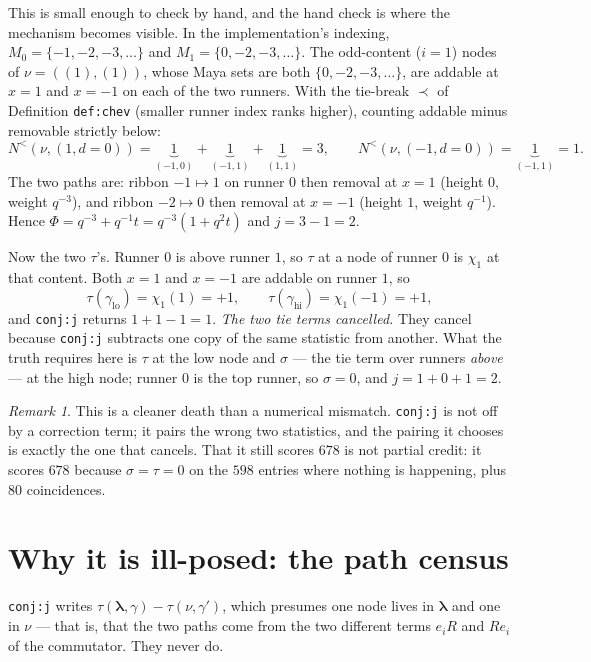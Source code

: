 \documentclass[11pt]{article}
\theoremstyle{definition}
\theoremstyle{remark}
\newtheorem{remark}[theorem]{Remark}
\newcommand{\bl}{\boldsymbol{\lambda}}
\newcommand{\Nlt}{N^{<}}
\begin{document}
This is small enough to check by hand, and the hand check is where the mechanism becomes
visible. In the implementation's indexing, $M_0=\{-1,-2,-3,\dots\}$ and
$M_1=\{0,-2,-3,\dots\}$. The odd-content ($i=1$) nodes of $\nu=((1),(1))$, whose Maya
sets are both $\{0,-2,-3,\dots\}$, are addable at $x=1$ and $x=-1$ on each of the two
runners. With the tie-break $\prec$ of Definition \texttt{def:chev} (smaller runner index
ranks higher), counting addable minus removable strictly below:
\[
\Nlt(\nu,(1,d{=}0))=\underbrace{1}_{(-1,0)}+\underbrace{1}_{(-1,1)}+\underbrace{1}_{(1,1)}=3,
\qquad
\Nlt(\nu,(-1,d{=}0))=\underbrace{1}_{(-1,1)}=1 .
\]
The two paths are: ribbon $-1\mapsto1$ on runner $0$ then removal at $x=1$ (height $0$,
weight $q^{-3}$), and ribbon $-2\mapsto0$ then removal at $x=-1$ (height $1$, weight
$q^{-1}$). Hence $\Phi=q^{-3}+q^{-1}t=q^{-3}(1+q^{2}t)$ and $j=3-1=2$.

Now the two $\tau$'s. Runner $0$ is above runner $1$, so $\tau$ at a node of runner $0$
is $\chi_1$ at that content. Both $x=1$ and $x=-1$ are addable on runner $1$, so
\[
\tau(\gamma_{\mathrm{lo}})=\chi_1(1)=+1,\qquad \tau(\gamma_{\mathrm{hi}})=\chi_1(-1)=+1,
\]
and \texttt{conj:j} returns $1+1-1=1$. \emph{The two tie terms cancelled.} They cancel
because \texttt{conj:j} subtracts one copy of the same statistic from another. What the
truth requires here is $\tau$ at the low node and $\sigma$ --- the tie term over runners
\emph{above} --- at the high node; runner $0$ is the top runner, so $\sigma=0$, and
$j=1+0+1=2$.

\begin{remark}
This is a cleaner death than a numerical mismatch. \texttt{conj:j} is not off by a
correction term; it pairs the wrong two statistics, and the pairing it chooses is exactly
the one that cancels. That it still scores $678$ is not partial credit: it scores $678$
because $\sigma=\tau=0$ on the $598$ entries where nothing is happening, plus $80$
coincidences.
\end{remark}

\section{Why it is ill-posed: the path census}\label{sec:paths}

\texttt{conj:j} writes $\tau(\bl,\gamma)-\tau(\nu,\gamma')$, which presumes one node
lives in $\bl$ and one in $\nu$ --- that is, that the two paths come from the two
different terms $e_iR$ and $Re_i$ of the commutator. They never do.
\end{document}
